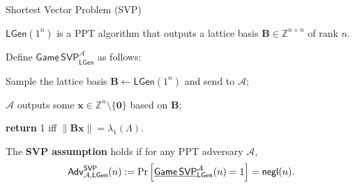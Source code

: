 \documentclass{zkdl-presentation-template}
\begin{document}
    \begin{frame}{Shortest Vector Problem (SVP)}
        \begin{definition}
            $\mathsf{LGen}(1^{n})$ is a PPT algorithm that outputs a lattice basis $\mathbf{B} \in \mathbb{Z}^{n \times n}$ of rank $n$.
        \end{definition}
        \pause

        \begin{definition}
            Define $\underline{\mathsf{Game}\,\mathsf{SVP}}^{\mathcal{A}}_{\mathsf{LGen}}$ as follows:
            \begin{algoen}
                \item Sample the lattice basis $\mathbf{B} \gets \mathsf{LGen}(1^{n})$ and send to $\mathcal{A}$;
                \item $\mathcal{A}$ outputs some $\mathbf{x} \in \mathbb{Z}^{n} \setminus \{\mathbf{0}\}$ based on $\mathbf{B}$;
                \item \textbf{return} 1 iff $\|\mathbf{B}\mathbf{x}\|=\lambda_1(\Lambda)$.
            \end{algoen}
            The \textbf{SVP assumption} holds if for any PPT adversary $\mathcal{A}$,
            \begin{equation*}
                \mathsf{Adv}^{\mathsf{SVP}}_{\mathcal{A},\mathsf{LGen}}(n) := \Pr\left[\underline{\mathsf{Game}\,\mathsf{SVP}}^{\mathcal{A}}_{\mathsf{LGen}}(n) = 1\right] = \mathsf{negl}(n).
            \end{equation*}
        \end{definition}
    \end{frame}
\end{document}
